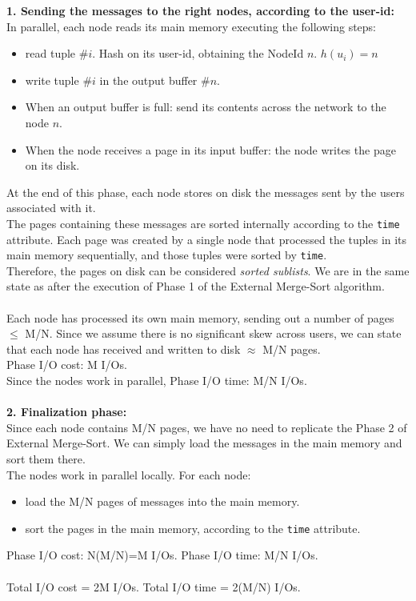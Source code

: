 \documentclass[paper=a4, fontsize=11pt]{scrartcl} %
\numberwithin{equation}{section} %
\numberwithin{figure}{section} %
\numberwithin{table}{section} %
\begin{document}
\textbf{1. Sending the messages to the right nodes, according to the user-id:} \\
In parallel, each node reads its main memory executing the following steps:\\
\begin{itemize}
\item read tuple \#$i$. Hash on its user-id, obtaining the NodeId $n$. $ h(u_i) = n$
\item write tuple \#$i$ in the output buffer \#$n$.
\item When an output buffer is full: send its contents across the network to the node $n$.
\item When the node receives a page in its input buffer: the node writes the page on its disk.
\end{itemize}
At the end of this phase, each node stores on disk the messages sent by the users associated with it.\\
The pages containing these messages are sorted internally according to the \verb|time| attribute. Each page was created by a single node that processed the tuples in its main memory sequentially, and those tuples were sorted by \verb|time|.\\
Therefore, the pages on disk can be considered \textit{sorted sublists}. We are in the same state as after the execution of Phase 1 of the External Merge-Sort algorithm.\\
~\\
Each node has processed its own main memory, sending out a number of pages $\leq$ M/N. Since we assume there is no significant skew across users, we can state that each node has received and written to disk $\approx$ M/N pages.\\
Phase I/O cost: M I/Os. \\
Since the nodes work in parallel, Phase I/O time: M/N I/Os. \\
~\\
\textbf{2. Finalization phase:}\\
Since each node contains M/N pages, we have no need to replicate the Phase 2 of External Merge-Sort. We can simply load the messages in the main memory and sort them there. \\
The nodes work in parallel locally. For each node:\\
\begin{itemize}
\item load the M/N pages of messages into the main memory. 
\item sort the pages in the main memory, according to the \verb|time| attribute. 
\end{itemize}
Phase I/O cost: N(M/N)=M I/Os. \quad Phase I/O time: M/N I/Os.\\
~\\
Total I/O cost = 2M I/Os. \quad \quad Total I/O time = 2(M/N) I/Os.\\
\end{document}
